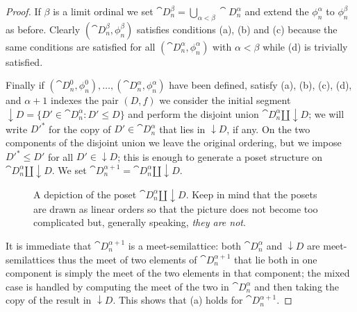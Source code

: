 \begin{proof}
  If \(\beta\) is a limit ordinal we set \(\cat{D}_n^\beta=\bigcup_{\alpha<\beta}\cat{D}_n^\alpha\) and extend the \(\phi_n^\alpha\) to \(\phi_n^\beta\) as before. Clearly \((\cat{D}_n^\beta,\phi_n^\beta)\) satisfies conditions (a), (b) and (c) because the same conditions are satisfied for all \((\cat{D}_n^\alpha, \phi_n^\alpha)\) with \(\alpha<\beta\) while (d) is trivially satisfied.

  Finally if \((\cat{D}_n^0,\phi_n^0),\ldots,(\cat{D}_n^\alpha,\phi_n^\alpha)\) have been defined, satisfy (a), (b), (c), (d), and \(\alpha+1\) indexes the pair \((D, f)\) we consider the initial segment \(\downarrow D = \{D'\in\cat{D}_n^\alpha\colon D'\leq D\}\) and perform the disjoint union \(\cat{D}_n^\alpha\amalg\downarrow D\); we will write \(D'^*\) for the copy of \(D'\in\cat{D}_n^\alpha\) that lies in \(\downarrow D\), if any. On the two components of the disjoint union we leave the original ordering, but we impose \(D'^*\leq D'\) for all \(D'\in{}\downarrow D\); this is enough to generate a poset structure on \(\cat{D}_n^\alpha\amalg\downarrow D\). We set \(\cat{D}_n^{\alpha+1} = \cat{D}_n^\alpha\amalg\downarrow D\).

  \begin{figure*}
    \begin{center}
    \end{center}
    \captionsetup{labelformat=empty}
    \caption{\small A depiction of the poset \(\cat{D}_n^\alpha\amalg\downarrow D\). Keep in mind that the posets are drawn as linear orders so that the picture does not become too complicated but, generally speaking, \emph{they are not}.}
  \end{figure*}

  It is immediate that \(\cat{D}_n^{\alpha +1}\) is a meet-semilattice: both \(\cat{D}_n^\alpha\) and \(\downarrow D\) are meet-semilattices thus the meet of two elements of \(\cat{D}_n^{\alpha+1}\) that lie both in one component is simply the meet of the two elements in that component; the mixed case is handled by computing the meet of the two in \(\cat{D}_n^\alpha\) and then taking the copy of the result in \(\downarrow D\). This shows that (a) holds for \(\cat{D}_n^{\alpha+1}\).


\end{proof}
